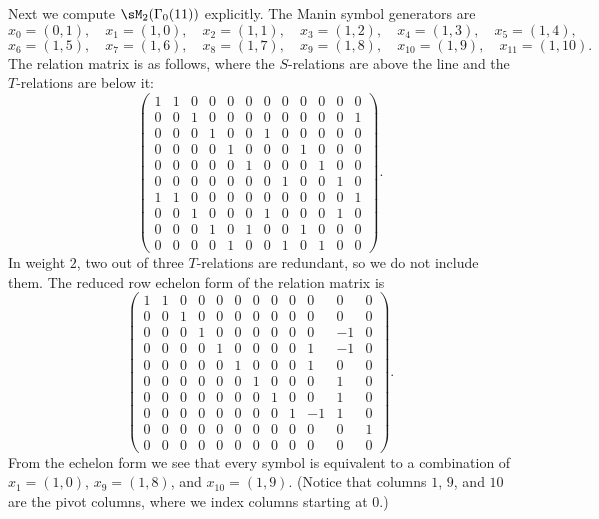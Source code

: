 \begin{example}
Next we compute $\sM_2(\Gamma_0(11))$ explicitly.
The Manin symbol generators are 
$$
x_0= (0, 1),\quad\!\!\!\!
x_1= (1, 0),\quad\!\!\!\!
x_2= (1, 1),\quad\!\!\!\!
x_3= (1, 2),\quad\!\!\!\!
x_4= (1, 3),\quad\!\!\!\!
x_5= (1, 4),\quad\!\!
$$
$$
x_6= (1, 5),\quad\!\!\!\!
x_7= (1, 6),\quad\!\!\!\!
x_8= (1, 7),\quad\!\!\!\!
x_9= (1, 8),\quad\!\!\!\!
x_{10}= (1, 9),\quad\!\!\!\!
x_{11}= (1, 10).
$$
The relation matrix is as follows, where the $S$-relations 
are above the line and the $T$-relations
are below it:
$$
\left(\begin{array}{ccccccccccccc}
1&1&0&0&0&0&0&0&0&0&0&0\\
0&0&1&0&0&0&0&0&0&0&0&1\\
0&0&0&1&0&0&1&0&0&0&0&0\\
0&0&0&0&1&0&0&0&1&0&0&0\\
0&0&0&0&0&1&0&0&0&1&0&0\\
0&0&0&0&0&0&0&1&0&0&1&0\\
\hline
1&1&0&0&0&0&0&0&0&0&0&1\\
0&0&1&0&0&0&1&0&0&0&1&0\\
0&0&0&1&0&1&0&0&1&0&0&0\\
0&0&0&0&1&0&0&1&0&1&0&0
\end{array}\right).
$$
In weight $2$, two out of three $T$-relations are redundant, so we
do not include them.
The reduced row echelon form of the relation matrix is
$$
\left(\begin{array}{cccccccccccc}
1&1&0&0&0&0&0&0&0&0&0&0\\
0&0&1&0&0&0&0&0&0&0&0&0\\
0&0&0&1&0&0&0&0&0&0&-1&0\\
0&0&0&0&1&0&0&0&0&1&-1&0\\
0&0&0&0&0&1&0&0&0&1&0&0\\
0&0&0&0&0&0&1&0&0&0&1&0\\
0&0&0&0&0&0&0&1&0&0&1&0\\
0&0&0&0&0&0&0&0&1&-1&1&0\\
0&0&0&0&0&0&0&0&0&0&0&1\\
0&0&0&0&0&0&0&0&0&0&0&0
\end{array}\right).
$$
From the echelon form we see that every symbol
is equivalent to a combination of
$x_1=(1,0)$, $x_9=(1,8)$, and $x_{10}=(1,9)$.
(Notice that columns $1$, $9$, and $10$ are the pivot
columns, where we index columns starting at $0$.)


\end{example}
